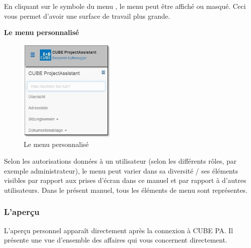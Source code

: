 \vspace{\baselineskip}

En cliquant sur le symbole du menu , le menu peut être affiché ou masqué. Ceci vous permet d'avoir une surface de travail plus grande.

\vspace{7cm}

\textbf{Le menu personnalisé}

\begin{figure}
\vspace{-35pt}
\includegraphics[height=50mm]{../chapters/01_Einfuehrung/pictures/1-3-1_MenuAngepasst.jpg}
\caption{Le menu personnalisé}
\end{figure}

Selon les autorisations données à un utilisateur (selon les différents rôles, par exemple administrateur), le menu peut varier dans sa diversité / ses éléments visibles par rapport aux prises d'écran dans ce manuel et par rapport à d'autres utilisateurs. Dans le présent manuel, tous les éléments de menu sont représentes.

\vspace{\baselineskip}

\subsubsection{L'aperçu}
\label{bkm:Ref132000001}
L'aperçu personnel apparaît directement après la connexion à CUBE PA. Il présente une vue d'ensemble des affaires qui vous concernent directement.

